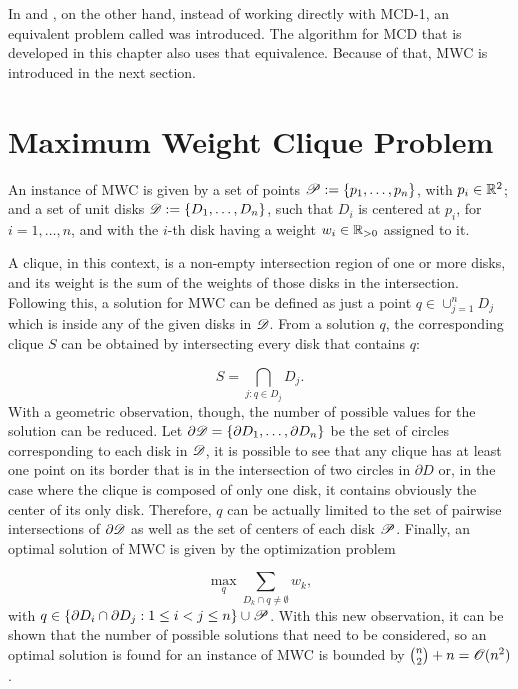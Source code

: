 In  and , on the other hand, instead of working directly with MCD-1, an equivalent problem called  was introduced. The algorithm for MCD that is developed in this chapter also uses that equivalence. Because of that, MWC is introduced in the next section.

\section{Maximum Weight Clique Problem}

An instance of MWC is given by a set of points $\mathscr{P}:=\{p_1,\dots,p_n\}$, with $p_i \in \mathbb{R}^2$; and a set of unit disks $\mathscr{D}:=\{D_1,\dots,D_n\}$, such that $D_i$ is centered at $p_i$, for $i=1,\dots,n$, and with the $i$-th disk having a weight $w_i\in \mathbb{R}_{>0}$ assigned to it. 

A clique, in this context, is a non-empty intersection region of one or more disks, and its weight is the sum of the weights of those disks in the intersection.
Following this, a solution for MWC can be defined as just a point $q\in\cup_{j=1}^n D_j$ which is inside any of the given disks in $\mathscr{D}$.
From a solution $q$, the corresponding clique $S$ can be obtained by intersecting every disk that contains $q$:

\begin{equation}
S = \bigcap_{j : q \in D_j} D_j.
\end{equation}
With a geometric observation, though, the number of possible values for the solution can be reduced.
Let $\partial \mathscr{D} = \{ \partial D_1, \dots, \partial D_n \}$ be the set of circles corresponding to each disk in $\mathscr{D}$, it is possible to see that any clique has at least one point on its border that is in the intersection of two circles in $\partial D$ or, in the case where the clique is composed of only one disk, it contains obviously the center of its only disk. Therefore, $q$ can be actually limited to the set of pairwise intersections of $\partial \mathscr{D}$ as well as the set of centers of each disk $\mathscr{P}$. Finally, an optimal solution of MWC is given by the optimization problem

\begin{equation}
\max_{q} \sum_{D_k \cap q \neq \emptyset} w_k,
\end{equation}
with $q \in \{\partial D_i \cap \partial D_j : 1 \le i < j \le n\} \cup \mathscr{P}$. With this new observation, it can be shown that the number of possible solutions that need to be considered, so an optimal solution is found for an instance of MWC is bounded by $\binom{n}{2} + n = \mathscr{O}(n^2)$.

